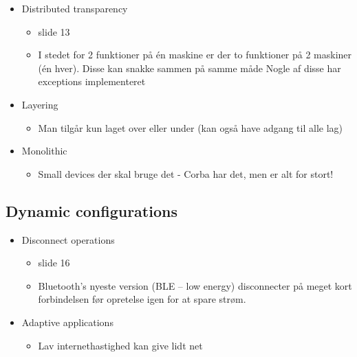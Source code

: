 \documentclass[oneside, 10pt]{memoir}
\begin{document}
\begin{itemize}
\item Distributed transparency
	\begin{itemize}
	\item slide 13
	\item I stedet for 2 funktioner på én maskine er der to funktioner på 2 maskiner (én hver). Disse kan snakke sammen på samme måde
	\subitem Nogle af disse har exceptions implementeret
	\end{itemize}

\item Layering
	\begin{itemize}
	\item Man tilgår kun laget over eller under (kan også have adgang til alle lag)
	\end{itemize}

\item Monolithic 
	\begin{itemize}
	\item Small devices der skal bruge det - Corba har det, men er alt for stort!
	\end{itemize}

\end{itemize}

\subsection{Dynamic configurations}

\begin{itemize}
\item Disconnect operations
	\begin{itemize}
	\item slide 16
	\item Bluetooth's nyeste version (BLE -- low energy) disconnecter på meget kort forbindelsen før opretelse igen for at spare strøm.
	\end{itemize}

\item Adaptive applications
	\begin{itemize}
	\item Lav internethastighed kan give lidt net
	\end{itemize}

\end{itemize}
\end{document}
